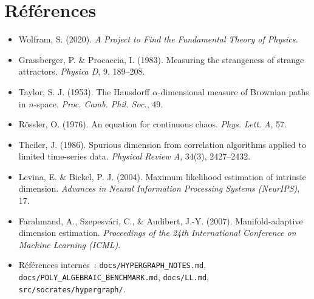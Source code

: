 \documentclass[11pt,a4paper]{article}
\begin{document}
\section*{Références}

\begin{itemize}
\item[] Wolfram, S. (2020). \emph{A Project to Find the Fundamental Theory of Physics.}
\item[] Grassberger, P. \& Procaccia, I. (1983). Measuring the strangeness of
  strange attractors. \emph{Physica D}, 9, 189--208.
\item[] Taylor, S. J. (1953). The Hausdorff $\alpha$-dimensional measure of
  Brownian paths in $n$-space. \emph{Proc. Camb. Phil. Soc.}, 49.
\item[] R\"ossler, O. (1976). An equation for continuous chaos.
  \emph{Phys. Lett. A}, 57.
\item[] Theiler, J. (1986). Spurious dimension from correlation algorithms
  applied to limited time-series data. \emph{Physical Review A}, 34(3),
  2427--2432.
\item[] Levina, E. \& Bickel, P. J. (2004). Maximum likelihood estimation
  of intrinsic dimension. \emph{Advances in Neural Information Processing
  Systems (NeurIPS)}, 17.
\item[] Farahmand, A., Szepesv\'ari, C., \& Audibert, J.-Y. (2007).
  Manifold-adaptive dimension estimation. \emph{Proceedings of the 24th
  International Conference on Machine Learning (ICML)}.
\item[] Références internes~: \texttt{docs/HYPERGRAPH\_NOTES.md},
  \texttt{docs/POLY\_ALGEBRAIC\_BENCHMARK.md}, \texttt{docs/LL.md},
  \texttt{src/socrates/hypergraph/}.
\end{itemize}
\end{document}
